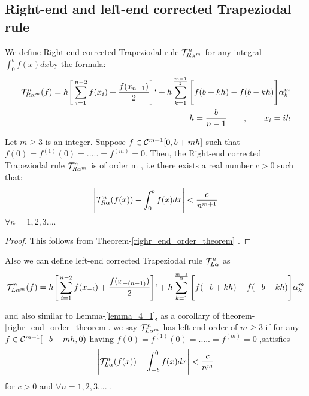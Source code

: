 \documentclass[../document.tex]{subfiles}
\begin{document}
	\subsection{Right-end and left-end corrected Trapeziodal rule}
	
	We define Right-end corrected Trapeziodal rule $\mathcal{T}_{R\alpha^m}^{n}$ for any integral $\int_{0}^{b} f(x) dx$by the formula:
	\begin{equation}
		\begin{split}
			\mathcal{T}_{R\alpha^m}^{n} (f)= 
			h\Bigg[ \sum_{i=1}^{n-2}f(x_i) 	+ \frac{f(x_{n-1})}{2}\Bigg]
			`			+	h\sum_{k=1}^{\frac{m-1}{2}} 
			\Bigg[
			f(b+kh) - f(b-kh)
			\Bigg]	\alpha_{k}^{m}
			\\
			\begin{align}
				h = \frac{b}{n-1} \qquad , \qquad x_i = ih
			\end{align}
		\end{split}
	\end{equation}
	
	\begin{lemma} \label{lemma_4_1}
		Let $m\geq3$ is an integer. Suppose $f \in \mathcal{C}^{m+1}[0,b+mh]$ such that $f(0) = f^{(1)}(0) = .....=f^{(m)} =0 $. Then, the Right-end corrected Trapeziodal rule $\mathcal{T}_{R\alpha^m}^{n}$ is of order m , i.e there exists a real number $c>0$ such that:
		\begin{equation}
			\Bigg|	\mathcal{T}_{R\alpha}^{n} (f(x)) - \int_{0}^{b} f(x) dx\Bigg|
			< \frac{c}{n^{m+1}}
		\end{equation}
		$\forall n=1,2,3....$
		\begin{proof}
			This follows from Theorem-\ref{righr_end_order_theorem} .
		\end{proof}
	\end{lemma}
	
	Also we can define left-end corrected Trapeziodal rule $\mathcal{T}_{L\alpha}^{n}$ as 
	\begin{equation}
		\begin{split}
			\mathcal{T}_{L\alpha^m}^{n} (f)= 
			h\Bigg[ 
			\sum_{i=1}^{n-2} f( x_{-i} ) + \frac{ f(x_{ -(n-1) }) }{2}
			\Bigg]
			`			+	h\sum_{k=1}^{\frac{m-1}{2}} 
			\Bigg[
			f(-b+kh) - f(-b-kh)
			\Bigg]	\alpha_{k}^{m}
		\end{split}
	\end{equation}
	
	and also similar to Lemma-\ref{lemma_4_1}, as a corollary  of theorem-\ref{righr_end_order_theorem}. we say  $\mathcal{T}_{L\alpha^m}^{n}$ has left-end order of $m\geq3$ if for any $f \in \mathcal{C}^{m+1}[-b-mh,0)$ having  $f(0) = f^{(1)}(0) = .....=f^{(m)} =0 $ ,satisfies
	\begin{equation}
		\Bigg|	\mathcal{T}_{L\alpha}^{n} (f(x)) - \int_{-b}^{0} f(x) dx\Bigg|
		< \frac{c}{n^{m}}
	\end{equation}
	for $c>0$ and 	$\forall n=1,2,3....$ .
	
\end{document}
